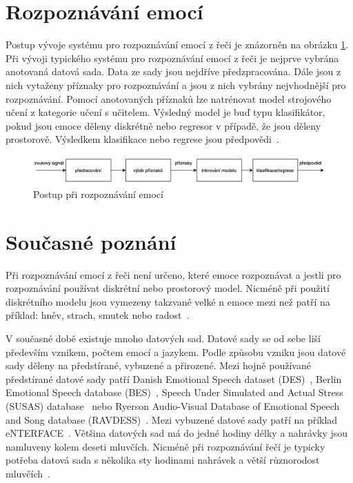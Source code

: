 \documentclass[FM,BP]{tulthesis}
\newcommand{\note}[1]{\todo[color=blue!40]{#1}}
\begin{document}
\section{Rozpoznávání emocí} %
Postup vývoje systému pro rozpoznávání emocí z řeči je znázorněn na obrázku \ref{fig:ser_pipeline}. Při vývoji typického systému pro rozpoznávání emocí z řeči je nejprve vybrána anotovaná datová sada. Data ze sady jsou nejdříve předzpracována. Dále jsou z nich vytaženy příznaky pro rozpoznávání a jsou z nich vybrány nejvhodnější pro rozpoznávání. Pomocí anotovaných příznaků lze natrénovat model strojového učení z kategorie učení s učitelem. Výsledný model je buď typu klasifikátor, pokud jsou emoce děleny diskrétně nebo regresor v případě, že jsou děleny prostorově. Výsledkem klasifikace nebo regrese jsou předpovědi~\cite{konar_chakraborty_2015}.

\begin{figure}[htbp]
\centerline{\includegraphics[width=\textwidth,height=\textheight,keepaspectratio]{speech_emotion_recognition-pipeline.png}}
\caption{Postup při rozpoznávání emocí}
\label{fig:ser_pipeline}
\end{figure}
\FloatBarrier

\section{Současné poznání}
Při rozpoznávání emocí z řeči není určeno, které emoce rozpoznávat a jestli pro rozpoznávání používat diskrétní nebo prostorový model. Nicméně při použití diskrétního modelu jsou vymezeny takzvané velké n emoce mezi než patří na příklad: hněv, strach, smutek nebo radost~\cite{konar_chakraborty_2015}.

V současné době existuje mnoho datových sad. Datové sady se od sebe liší především vznikem, počtem emocí a jazykem. Podle způsobu vzniku jsou datové sady děleny na předstírané, vybuzené a přirozené. Mezi hojně používané předstírané datové sady patří Danish Emotional Speech dataset (DES)~\cite{DBLP:conf/interspeech/EngbergHAD97}, Berlin Emotional Speech database (BES)~\cite{bes_dataset}, Speech Under Simulated and Actual Stress (SUSAS) database~\cite{DBLP:conf/interspeech/HansenB97} nebo Ryerson Audio-Visual Database of Emotional Speech and Song database (RAVDESS)~\cite{Livingstone2018}. Mezi vybuzené datové sady patří na příklad eNTERFACE~\cite{DBLP:conf/icde/MartinKMP06}. Většina datových sad má do jedné hodiny délky a nahrávky jsou namluveny kolem deseti mluvčích. Nicméně při rozpoznávání řečí je typicky potřeba datová sada s několika sty hodinami nahrávek a větší různorodost mluvčích~\cite{konar_chakraborty_2015}. \note{rozpoznávání řečí? jako jazyků?}
\end{document}
